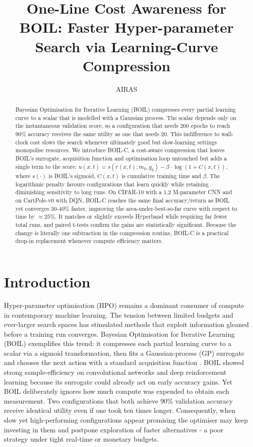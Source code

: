 \documentclass{article} %
\title{One-Line Cost Awareness for BOIL: Faster Hyper-parameter Search via Learning-Curve Compression}
\author{AIRAS}
\begin{document}
\maketitle

\begin{abstract}
Bayesian Optimisation for Iterative Learning (BOIL) compresses every partial learning curve to a scalar that is modelled with a Gaussian process. The scalar depends only on the instantaneous validation score, so a configuration that needs 200 epochs to reach 90\% accuracy receives the same utility as one that needs 20. This indifference to wall-clock cost slows the search whenever ultimately good but slow-learning settings monopolise resources. We introduce BOIL-C, a cost-aware compression that leaves BOIL’s surrogate, acquisition function and optimisation loop untouched but adds a single term to the score: \(u(x,t)=s(r(x,t);m_0,g_0)-\beta\cdot\log(1+C(x,t))\), where \(s(\cdot)\) is BOIL’s sigmoid, \(C(x,t)\) is cumulative training time and \(\beta\). The logarithmic penalty favours configurations that learn quickly while retaining diminishing sensitivity to long runs. On CIFAR-10 with a 1.2 M-parameter CNN and on CartPole-v0 with DQN, BOIL-C reaches the same final accuracy/return as BOIL yet converges 30-40\% faster, improving the area-under-best-so-far curve with respect to time by \(\approx 25\%\). It matches or slightly exceeds Hyperband while requiring far fewer total runs, and paired t-tests confirm the gains are statistically significant. Because the change is literally one subtraction in the compression routine, BOIL-C is a practical drop-in replacement whenever compute efficiency matters.
\end{abstract}

\section{Introduction}
\label{sec:intro}
Hyper-parameter optimisation (HPO) remains a dominant consumer of compute in contemporary machine learning. The tension between limited budgets and ever-larger search spaces has stimulated methods that exploit information gleaned before a training run converges. Bayesian Optimisation for Iterative Learning (BOIL) exemplifies this trend: it compresses each partial learning curve to a scalar via a sigmoid transformation, then fits a Gaussian-process (GP) surrogate and chooses the next action with a standard acquisition function \cite{nguyen-2019-bayesian}. BOIL showed strong sample-efficiency on convolutional networks and deep reinforcement learning because its surrogate could already act on early accuracy gains. Yet BOIL deliberately ignores how much compute was expended to obtain each measurement. Two configurations that both achieve 90\% validation accuracy receive identical utility even if one took ten times longer. Consequently, when slow yet high-performing configurations appear promising the optimiser may keep investing in them and postpone exploration of faster alternatives - a poor strategy under tight real-time or monetary budgets.
\end{document}
